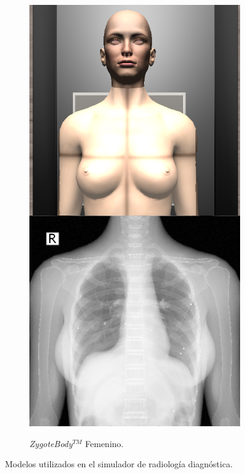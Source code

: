 \begin{figure}[ht]
\begin{subfigure}[b]{0.24\linewidth}
    \end{subfigure}
     \begin{subfigure}[b]{0.24\linewidth}
        \centering
        {\includegraphics[width=\linewidth]{IMG/femaleex.png}}
        \caption{\emph{ZygoteBody}$^{TM}$ Femenino.}
    \end{subfigure}
    \caption{\label{fig:xraymodels} Modelos utilizados en el simulador de radiología diagnóstica.}
   \end{figure}
   
